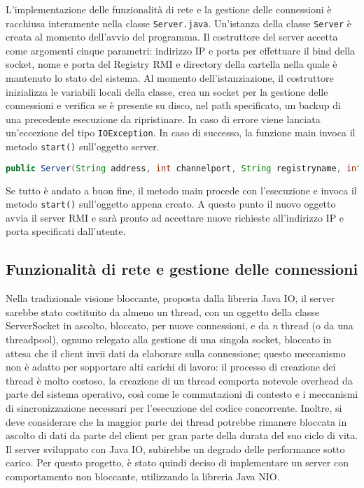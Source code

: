 \documentclass{article}
\begin{document}
L'implementazione delle funzionalità di rete e la gestione delle connessioni è racchiusa interamente nella classe \texttt{Server.java}. Un'istanza della classe \texttt{Server} è creata al momento dell'avvio del programma. Il costruttore del server accetta come argomenti cinque parametri: indirizzo IP e porta per effettuare il bind della socket, nome e porta del Registry RMI e directory della cartella nella quale è mantenuto lo stato del sistema. Al momento dell'istanziazione, il costruttore inizializza le variabili locali della classe, crea un socket per la gestione delle connessioni e verifica se è presente su disco, nel path specificato, un backup di una precedente esecuzione da ripristinare. In caso di errore viene lanciata un'eccezione del tipo \texttt{IOException}. In caso di successo, la funzione main invoca il metodo \texttt{start()} sull'oggetto server.\newline
\begin{lstlisting}[language=Java, caption=Firma del metodo costruttore della classe \texttt{Server.java}]
public Server(String address, int channelport, String registryname, int rmiport, String workingdir)
\end{lstlisting}
Se tutto è andato a buon fine, il metodo main procede con l'esecuzione e invoca il metodo \texttt{start()} sull'oggetto appena creato. A questo punto il nuovo oggetto avvia il server RMI e sarà pronto ad accettare nuove richieste all'indirizzo IP e porta specificati dall'utente.

\subsection{Funzionalità di rete e gestione delle connessioni}

Nella tradizionale visione bloccante, proposta dalla libreria Java IO, il server sarebbe stato costituito da almeno un thread, con un oggetto della classe ServerSocket in ascolto, bloccato, per nuove connessioni, e da \emph n thread (o da una threadpool), ognuno relegato alla gestione di una singola socket, bloccato in attesa che il client invii dati da elaborare sulla connessione; questo meccanismo non è adatto per sopportare alti carichi di lavoro: il processo di creazione dei thread è molto costoso, la creazione di un thread comporta notevole overhead da parte del sistema operativo, così come le commutazioni di contesto e i meccanismi di sincronizzazione necessari per l'esecuzione del codice concorrente. Inoltre, si deve considerare che la maggior parte dei thread potrebbe rimanere bloccata in ascolto di dati da parte del client per gran parte della durata del suo ciclo di vita. Il server sviluppato con Java IO, subirebbe un degrado delle performance sotto carico.
Per questo progetto, è stato quindi deciso di implementare un server con comportamento non bloccante, utilizzando la libreria Java NIO.
\newline
\end{document}
